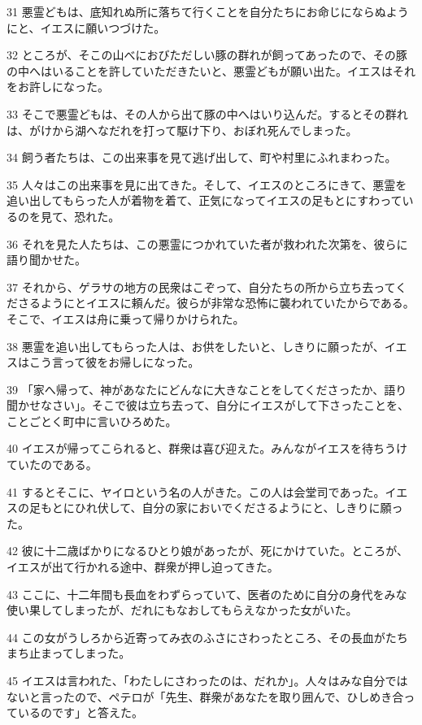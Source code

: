 \par 31 悪霊どもは、底知れぬ所に落ちて行くことを自分たちにお命じにならぬようにと、イエスに願いつづけた。
\par 32 ところが、そこの山べにおびただしい豚の群れが飼ってあったので、その豚の中へはいることを許していただきたいと、悪霊どもが願い出た。イエスはそれをお許しになった。
\par 33 そこで悪霊どもは、その人から出て豚の中へはいり込んだ。するとその群れは、がけから湖へなだれを打って駆け下り、おぼれ死んでしまった。
\par 34 飼う者たちは、この出来事を見て逃げ出して、町や村里にふれまわった。
\par 35 人々はこの出来事を見に出てきた。そして、イエスのところにきて、悪霊を追い出してもらった人が着物を着て、正気になってイエスの足もとにすわっているのを見て、恐れた。
\par 36 それを見た人たちは、この悪霊につかれていた者が救われた次第を、彼らに語り聞かせた。
\par 37 それから、ゲラサの地方の民衆はこぞって、自分たちの所から立ち去ってくださるようにとイエスに頼んだ。彼らが非常な恐怖に襲われていたからである。そこで、イエスは舟に乗って帰りかけられた。
\par 38 悪霊を追い出してもらった人は、お供をしたいと、しきりに願ったが、イエスはこう言って彼をお帰しになった。
\par 39 「家へ帰って、神があなたにどんなに大きなことをしてくださったか、語り聞かせなさい」。そこで彼は立ち去って、自分にイエスがして下さったことを、ことごとく町中に言いひろめた。
\par 40 イエスが帰ってこられると、群衆は喜び迎えた。みんながイエスを待ちうけていたのである。
\par 41 するとそこに、ヤイロという名の人がきた。この人は会堂司であった。イエスの足もとにひれ伏して、自分の家においでくださるようにと、しきりに願った。
\par 42 彼に十二歳ばかりになるひとり娘があったが、死にかけていた。ところが、イエスが出て行かれる途中、群衆が押し迫ってきた。
\par 43 ここに、十二年間も長血をわずらっていて、医者のために自分の身代をみな使い果してしまったが、だれにもなおしてもらえなかった女がいた。
\par 44 この女がうしろから近寄ってみ衣のふさにさわったところ、その長血がたちまち止まってしまった。
\par 45 イエスは言われた、「わたしにさわったのは、だれか」。人々はみな自分ではないと言ったので、ペテロが「先生、群衆があなたを取り囲んで、ひしめき合っているのです」と答えた。
